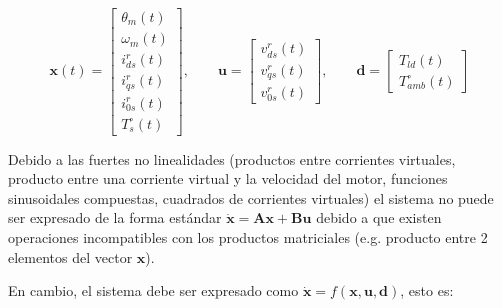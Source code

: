\documentclass[blue,fullpaper]{ludusofficial}  %
\begin{document}
\begin{equation*}
    \mathbf{x}(t)= \begin{bmatrix} \theta_{m}(t) \\ \omega_{m}(t) \\ i_{ds}^{r}(t) \\ i_{qs}^{r}(t) \\ i_{0s}^{r}(t) \\ T_{s}^{\circ}(t) \end{bmatrix}, \qquad \mathbf{u}=\begin{bmatrix} v_{ds}^{r}(t) \\ v_{qs}^{r}(t) \\ v_{0s}^{r}(t) \end{bmatrix}, \qquad \mathbf{d} = \begin{bmatrix} T_{ld}(t) \\ T_{amb}^{\circ}(t)  \end{bmatrix}
\end{equation*}

Debido a las fuertes no linealidades (productos entre corrientes virtuales, producto entre una corriente virtual y la velocidad del motor, funciones sinusoidales compuestas, cuadrados de corrientes virtuales) el sistema no puede ser expresado de la forma estándar $\dot{\mathbf{x}}= \mathbf{A} \mathbf{x} + \mathbf{B} \mathbf{u}$ debido a que existen operaciones incompatibles con los productos matriciales (e.g. producto entre 2 elementos del vector $\mathbf{x}$).

En cambio, el sistema debe ser expresado como $\dot{\mathbf{x}}= f (\mathbf{x}, \mathbf{u}, \mathbf{d})$, esto es:
\end{document}
